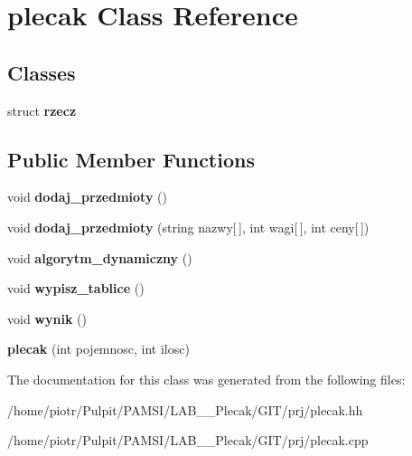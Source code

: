 \hypertarget{classplecak}{\section{plecak \-Class \-Reference}
\label{classplecak}
}
\subsection*{\-Classes}
\begin{DoxyCompactItemize}
\item 
struct {\bfseries rzecz}
\end{DoxyCompactItemize}
\subsection*{\-Public \-Member \-Functions}
\begin{DoxyCompactItemize}
\item 
\hypertarget{classplecak_aea1ff6cd79ec3e3108d40fca86242138}{void {\bfseries dodaj\-\_\-przedmioty} ()}\label{classplecak_aea1ff6cd79ec3e3108d40fca86242138}

\item 
\hypertarget{classplecak_a3e8d39b030a84f2cb2a335369bce2eee}{void {\bfseries dodaj\-\_\-przedmioty} (string nazwy\mbox{[}$\,$\mbox{]}, int wagi\mbox{[}$\,$\mbox{]}, int ceny\mbox{[}$\,$\mbox{]})}\label{classplecak_a3e8d39b030a84f2cb2a335369bce2eee}

\item 
\hypertarget{classplecak_aa1745a766507f7dd06dbc9f407a796ae}{void {\bfseries algorytm\-\_\-dynamiczny} ()}\label{classplecak_aa1745a766507f7dd06dbc9f407a796ae}

\item 
\hypertarget{classplecak_a3dfdca773ed5c3fe4e719ef246807bd7}{void {\bfseries wypisz\-\_\-tablice} ()}\label{classplecak_a3dfdca773ed5c3fe4e719ef246807bd7}

\item 
\hypertarget{classplecak_ab2f98203c352039a9707a603322ac5c1}{void {\bfseries wynik} ()}\label{classplecak_ab2f98203c352039a9707a603322ac5c1}

\item 
\hypertarget{classplecak_a0d4bcbfc1bdca24de78152198e6ee3f7}{{\bfseries plecak} (int pojemnosc, int ilosc)}\label{classplecak_a0d4bcbfc1bdca24de78152198e6ee3f7}

\end{DoxyCompactItemize}


\-The documentation for this class was generated from the following files\-:\begin{DoxyCompactItemize}
\item 
/home/piotr/\-Pulpit/\-P\-A\-M\-S\-I/\-L\-A\-B\-\_\-\_\-\-Plecak/\-G\-I\-T/prj/plecak.\-hh\item 
/home/piotr/\-Pulpit/\-P\-A\-M\-S\-I/\-L\-A\-B\-\_\-\_\-\-Plecak/\-G\-I\-T/prj/plecak.\-cpp\end{DoxyCompactItemize}
